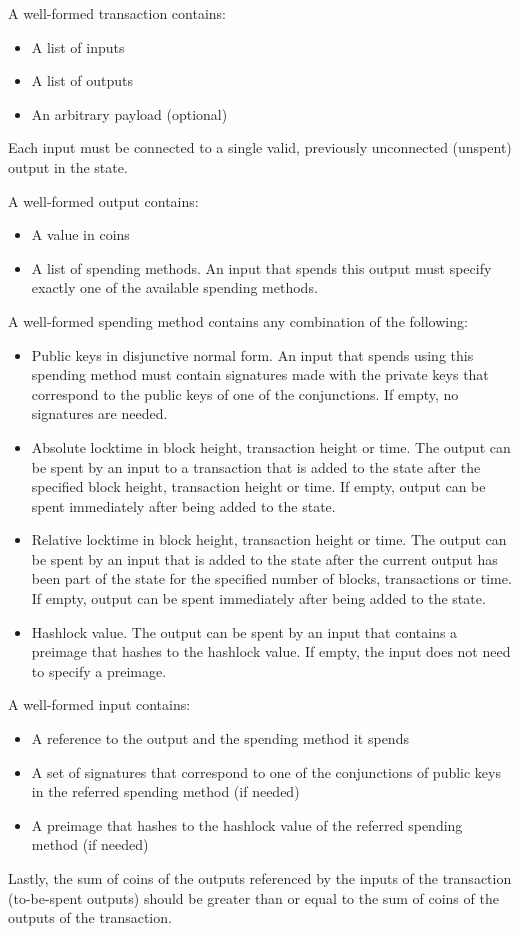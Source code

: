 A well-formed transaction contains:
\begin{itemize}
  \item A list of inputs
  \item A list of outputs
  \item An arbitrary payload (optional)
\end{itemize}
Each input must be connected to a single valid, previously unconnected (unspent)
output in the state.

A well-formed output contains:
\begin{itemize}
  \item A value in coins
  \item A list of spending methods. An input that spends this output must
  specify exactly one of the available spending methods.
\end{itemize}

A well-formed spending method contains any combination of the following:
\begin{itemize}
  \item Public keys in disjunctive normal form. An input that spends using this
  spending method must contain signatures made with the private keys that
  correspond to the public keys of one of the conjunctions. If empty, no
  signatures are needed.
  \item Absolute locktime in block height, transaction height or time. The
  output can be spent by an input to a transaction that is added to the state
  after the specified block height, transaction height or time. If empty, output
  can be spent immediately after being added to the state.
  \item Relative locktime in block height, transaction height or time. The
  output can be spent by an input that is added to the state after the current
  output has been part of the state for the specified number of blocks,
  transactions or time. If empty, output can be spent immediately after being
  added to the state.
  \item Hashlock value. The output can be spent by an input that contains a
  preimage that hashes to the hashlock value. If empty, the input does not need
  to specify a preimage.
\end{itemize}

A well-formed input contains:
\begin{itemize}
  \item A reference to the output and the spending method it spends
  \item A set of signatures that correspond to one of the conjunctions of public
  keys in the referred spending method (if needed)
  \item A preimage that hashes to the hashlock value of the referred spending
  method (if needed)
\end{itemize}

Lastly, the sum of coins of the outputs referenced by the inputs of the
transaction (to-be-spent outputs) should be greater than or equal to the sum of
coins of the outputs of the transaction.
